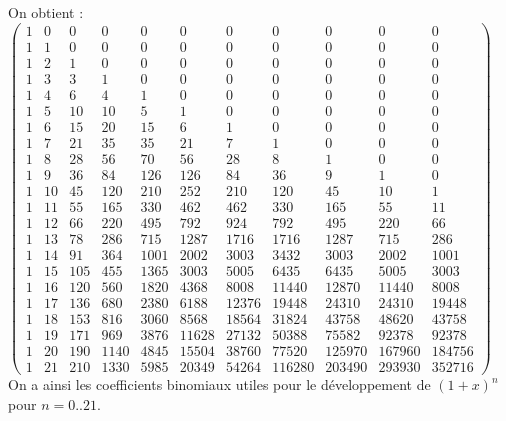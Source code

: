 \documentclass[a4paper,11pt]{book}
\begin{document}
On obtient :\\
$\left(\begin{array}{ccccccccccc}
1 & 0 & 0 & 0 & 0 & 0 & 0 & 0 & 0 & 0 & 0 \\
1 & 1 & 0 & 0 & 0 & 0 & 0 & 0 & 0 & 0 & 0 \\
1 & 2 & 1 & 0 & 0 & 0 & 0 & 0 & 0 & 0 & 0 \\
1 & 3 & 3 & 1 & 0 & 0 & 0 & 0 & 0 & 0 & 0 \\
1 & 4 & 6 & 4 & 1 & 0 & 0 & 0 & 0 & 0 & 0 \\
1 & 5 & 10 & 10 & 5 & 1 & 0 & 0 & 0 & 0 & 0 \\
1 & 6 & 15 & 20 & 15 & 6 & 1 & 0 & 0 & 0 & 0 \\
1 & 7 & 21 & 35 & 35 & 21 & 7 & 1 & 0 & 0 & 0 \\
1 & 8 & 28 & 56 & 70 & 56 & 28 & 8 & 1 & 0 & 0\\
1 & 9 & 36 & 84 & 126 & 126 & 84 & 36 & 9 & 1 & 0 \\
1 & 10 & 45 & 120 & 210 & 252 & 210 & 120 & 45 & 10 & 1\\
1 & 11 & 55 & 165 & 330 & 462 & 462 & 330 & 165 & 55 & 11\\
1 & 12 & 66 & 220 & 495 & 792 & 924 & 792 & 495 & 220 & 66\\
1 & 13 & 78 & 286 & 715 & 1287 & 1716 & 1716 & 1287 & 715 & 286\\
1 & 14 & 91 & 364 & 1001 & 2002 & 3003 & 3432 & 3003 & 2002 & 1001\\
1 & 15 & 105 & 455 & 1365 & 3003 & 5005 & 6435 & 6435 & 5005 & 3003\\
1 & 16 & 120 & 560 & 1820 & 4368 & 8008 & 11440 & 12870 & 11440 & 8008\\
1 & 17 & 136 & 680 & 2380 & 6188 & 12376 & 19448 & 24310 & 24310 & 19448\\
1 & 18 & 153 & 816 & 3060 & 8568 & 18564 & 31824 & 43758 & 48620 & 43758\\
1 & 19 & 171 & 969 & 3876 & 11628 & 27132 & 50388 & 75582 & 92378 & 92378\\
1 & 20 & 190 & 1140 & 4845 & 15504 & 38760 & 77520 & 125970 & 167960 & 184756\\
1 & 21 & 210 & 1330 & 5985 & 20349 & 54264 & 116280 & 203490 & 293930 & 352716
\end{array}\right) $\\
On a ainsi les coefficients binomiaux utiles pour le d\'eveloppement de 
$(1+x)^n$ pour $n=0..21$.
\end{document}
